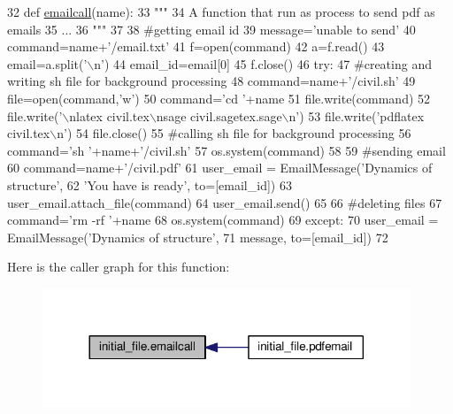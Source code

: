 \begin{DoxyCode}
32 \textcolor{keyword}{def }\hyperlink{namespaceinitial__file_ad9d26ace18fc618ee70df3c0c94927b7}{emailcall}(name):
33     \textcolor{stringliteral}{"""}
34 \textcolor{stringliteral}{    A function that run as process to send pdf as emails}
35 \textcolor{stringliteral}{    ...}
36 \textcolor{stringliteral}{    """}
37     
38     \textcolor{comment}{#getting email id }
39     message=\textcolor{stringliteral}{'unable to send'}
40     command=name+\textcolor{stringliteral}{'/email.txt'}
41     f=open(command)
42     a=f.read()
43         email=a.split(\textcolor{stringliteral}{'\(\backslash\)n'})
44         email\_id=email[0]
45     f.close()
46     \textcolor{keywordflow}{try}:
47         \textcolor{comment}{#creating and writing sh file for background processing}
48         command=name+\textcolor{stringliteral}{'/civil.sh'}
49         file=open(command,\textcolor{stringliteral}{'w'})
50         command=\textcolor{stringliteral}{'cd '}+name
51         file.write(command)
52         file.write(\textcolor{stringliteral}{'\(\backslash\)nlatex civil.tex\(\backslash\)nsage civil.sagetex.sage\(\backslash\)n'})
53         file.write(\textcolor{stringliteral}{'pdflatex civil.tex\(\backslash\)n'})
54         file.close()
55         \textcolor{comment}{#calling sh file for background processing}
56         command=\textcolor{stringliteral}{'sh '}+name+\textcolor{stringliteral}{'/civil.sh'}
57         os.system(command)
58         
59         \textcolor{comment}{#sending email}
60         command=name+\textcolor{stringliteral}{'/civil.pdf'}
61         user\_email = EmailMessage(\textcolor{stringliteral}{'Dynamics of structure'},
62         \textcolor{stringliteral}{'You have is ready'}, to=[email\_id])
63         user\_email.attach\_file(command)
64         user\_email.send()
65         
66         \textcolor{comment}{#deleting files}
67         command=\textcolor{stringliteral}{'rm -rf '}+name
68         os.system(command)
69     \textcolor{keywordflow}{except}:
70         user\_email = EmailMessage(\textcolor{stringliteral}{'Dynamics of structure'},
71         message, to=[email\_id])
72 
\end{DoxyCode}


Here is the caller graph for this function\+:\nopagebreak
\begin{figure}[H]
\begin{center}
\leavevmode
\includegraphics[width=312pt]{namespaceinitial__file_ad9d26ace18fc618ee70df3c0c94927b7_icgraph}
\end{center}
\end{figure}


